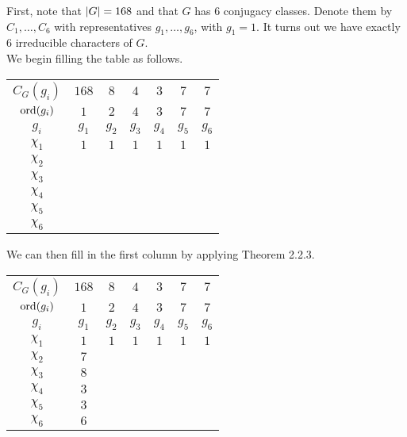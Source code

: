 \begin{boxexample}[Constructing the Character Table of $G = \PSL{2, 7}$]
    First, note that $\left\lvert G \right\rvert = 168$ and that $G$ has $6$ conjugacy classes. Denote them by $C_1, \ldots, C_6$ with representatives $g_1, \ldots, g_6$, with $g_1 = 1$. It turns out we have exactly $6$ irreducible characters of $G$. \\ %

    We begin filling the table as follows.
    \begin{table}[H]
        \centering
        \begin{tabular}{|c|cccccc|}
            $C_G(g_i)$ & $168$ & $8$ & $4$ & $3$ & $7$ & $7$ \\
            $\operatorname{ord}\!\left( g_i \right)$ & $1$ & $2$ & $4$ & $3$ & $7$ & $7$ \\
            $g_i$ & $g_1$ & $g_2$ & $g_3$ & $g_4$ & $g_5$ & $g_6$ \\
            \hline
            $\chi_1$ & $1$ & $1$ & $1$ & $1$ & $1$ & $1$ \\
            $\chi_2$ & & & & & & \\
            $\chi_3$ & & & & & & \\
            $\chi_4$ & & & & & & \\
            $\chi_5$ & & & & & & \\
            $\chi_6$ & & & & & & \\
        \end{tabular}
    \end{table}
    We can then fill in the first column by applying Theorem 2.2.3. %
    \begin{table}[H]
        \centering
        \begin{tabular}{|c|cccccc|}
            $C_G(g_i)$ & $168$ & $8$ & $4$ & $3$ & $7$ & $7$ \\
            $\operatorname{ord}\!\left( g_i \right)$ & $1$ & $2$ & $4$ & $3$ & $7$ & $7$ \\
            $g_i$ & $g_1$ & $g_2$ & $g_3$ & $g_4$ & $g_5$ & $g_6$ \\
            \hline
            $\chi_1$ & $1$ & $1$ & $1$ & $1$ & $1$ & $1$ \\
            $\chi_2$ & $7$ & & & & & \\
            $\chi_3$ & $8$ & & & & & \\
            $\chi_4$ & $3$ & & & & & \\
            $\chi_5$ & $3$ & & & & & \\
            $\chi_6$ & $6$ & & & & & \\

\end{tabular}
\end{table}
\end{boxexample}
